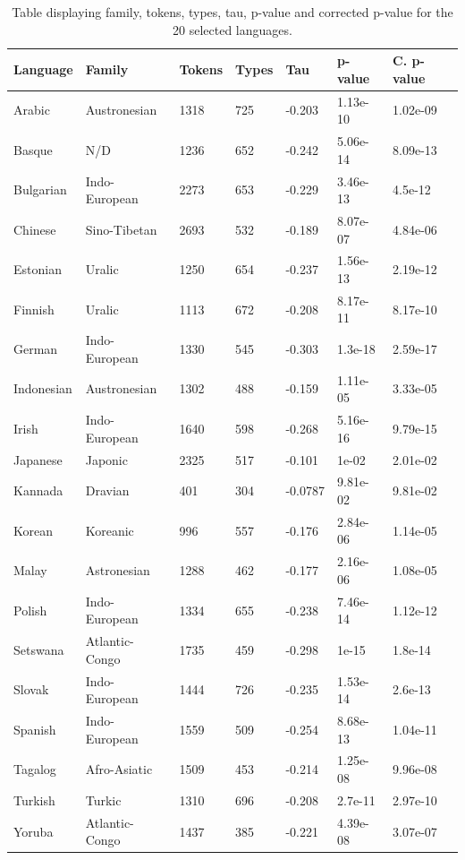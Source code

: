 \begin{table}[]
\begin{tabular}{lllllll}
Language   & Family         & Tokens & Types & Tau     & p-value  & C. p-value \\ \hline
Arabic     & Austronesian   & 1318   & 725   & -0.203  & 1.13e-10 & 1.02e-09   \\
Basque     & N/D            & 1236   & 652   & -0.242  & 5.06e-14 & 8.09e-13   \\
Bulgarian  & Indo-European  & 2273   & 653   & -0.229  & 3.46e-13 & 4.5e-12    \\
Chinese    & Sino-Tibetan   & 2693   & 532   & -0.189  & 8.07e-07 & 4.84e-06   \\
Estonian   & Uralic         & 1250   & 654   & -0.237  & 1.56e-13 & 2.19e-12   \\
Finnish    & Uralic         & 1113   & 672   & -0.208  & 8.17e-11 & 8.17e-10   \\
German     & Indo-European  & 1330   & 545   & -0.303  & 1.3e-18  & 2.59e-17   \\
Indonesian & Austronesian   & 1302   & 488   & -0.159  & 1.11e-05 & 3.33e-05   \\
Irish      & Indo-European  & 1640   & 598   & -0.268  & 5.16e-16 & 9.79e-15   \\
Japanese   & Japonic        & 2325   & 517   & -0.101  & 1e-02    & 2.01e-02   \\
Kannada    & Dravian        & 401    & 304   & -0.0787 & 9.81e-02 & 9.81e-02   \\
Korean     & Koreanic       & 996    & 557   & -0.176  & 2.84e-06 & 1.14e-05   \\
Malay      & Astronesian    & 1288   & 462   & -0.177  & 2.16e-06 & 1.08e-05   \\
Polish     & Indo-European  & 1334   & 655   & -0.238  & 7.46e-14 & 1.12e-12   \\
Setswana   & Atlantic-Congo & 1735   & 459   & -0.298  & 1e-15    & 1.8e-14    \\
Slovak     & Indo-European  & 1444   & 726   & -0.235  & 1.53e-14 & 2.6e-13    \\
Spanish    & Indo-European  & 1559   & 509   & -0.254  & 8.68e-13 & 1.04e-11   \\
Tagalog    & Afro-Asiatic   & 1509   & 453   & -0.214  & 1.25e-08 & 9.96e-08   \\
Turkish    & Turkic         & 1310   & 696   & -0.208  & 2.7e-11  & 2.97e-10   \\
Yoruba     & Atlantic-Congo & 1437   & 385   & -0.221  & 4.39e-08 & 3.07e-07  
\end{tabular}
\caption{Table displaying family, tokens, types, tau, p-value and corrected p-value for the 20 selected languages.}
\label{table1}
\end{table}

